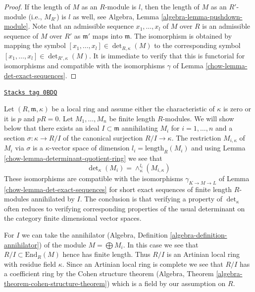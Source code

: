 \begin{proof}

If the length of $M$ as an $R$-module is $l$, then the length
of $M$ as an $R'$-module (i.e., $M_{R'}$) is $l$ as well, see
Algebra, Lemma \ref{algebra-lemma-pushdown-module}.
Note that an admissible sequence $x_1, \ldots, x_l$ of $M$
over $R$ is an admissible sequence of $M$ over $R'$ as $\mathfrak m'$
maps into $\mathfrak m$.
The isomorphism is obtained by mapping the symbol
$[x_1, \ldots, x_l] \in \det\nolimits_{R, \kappa}(M)$
to the corresponding symbol
$[x_1, \ldots, x_l] \in \det\nolimits_{R', \kappa}(M)$.
It is immediate to verify that this is functorial for
isomorphisms and compatible with the isomorphisms
$\gamma$ of Lemma \ref{chow-lemma-det-exact-sequences}.
\end{proof}

\begin{remark}
\label{chow-remark-explain-determinant}
\href{https://stacks.math.columbia.edu/tag/0BDQ}{\texttt{Stacks tag 0BDQ}}

Let $(R, \mathfrak m, \kappa)$ be a local ring and assume either
the characteristic of $\kappa$ is zero or it is $p$ and $p R = 0$.
Let $M_1, \ldots, M_n$ be finite length $R$-modules.
We will show below that there exists an
ideal $I \subset \mathfrak m$ annihilating $M_i$ for $i = 1, \ldots, n$
and a section $\sigma : \kappa \to R/I$ of the canonical surjection
$R/I \to \kappa$. The restriction $M_{i, \kappa}$ of $M_i$ via $\sigma$
is a $\kappa$-vector space of dimension $l_i = \text{length}_R(M_i)$ and
using Lemma \ref{chow-lemma-determinant-quotient-ring} we see that
$$
\det\nolimits_\kappa(M_i) = \wedge_\kappa^{l_i}(M_{i, \kappa})
$$
These isomorphisms are compatible with the isomorphisms
$\gamma_{K \to M \to L}$ of Lemma \ref{chow-lemma-det-exact-sequences}
for short exact sequences of finite length $R$-modules annihilated
by $I$. The conclusion is that verifying a property of
$\det_\kappa$ often reduces to verifying corresponding properties
of the usual determinant on the category finite dimensional vector
spaces.

\medskip\noindent
For $I$ we can take the annihilator
(Algebra, Definition \ref{algebra-definition-annihilator})
of the module $M = \bigoplus M_i$. In this case we see that
$R/I \subset \text{End}_R(M)$ hence has finite length.
Thus $R/I$ is an Artinian local ring with residue field $\kappa$.
Since an Artinian local ring is complete we see that $R/I$
has a coefficient ring by the Cohen structure theorem
(Algebra, Theorem \ref{algebra-theorem-cohen-structure-theorem})
which is a field by our assumption on $R$.
\end{remark}

